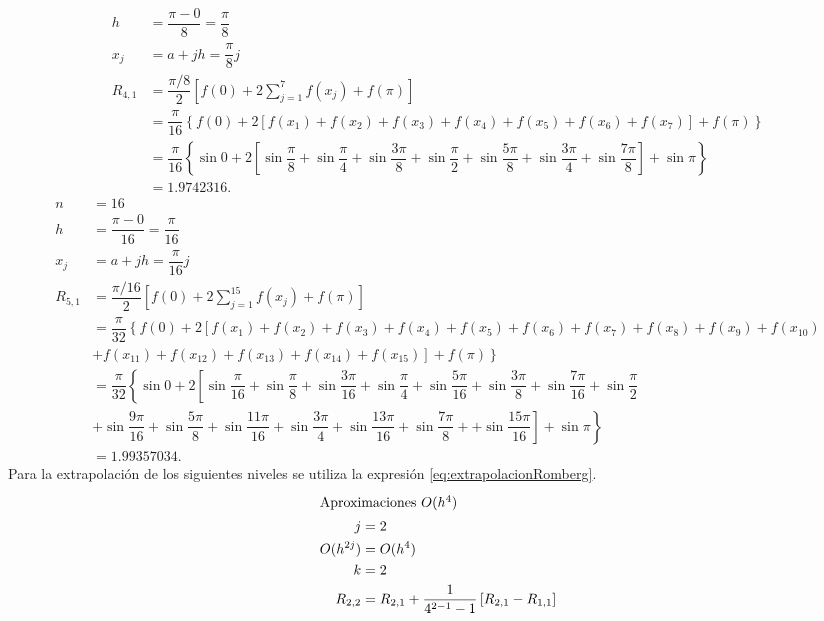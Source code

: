 \begin{exerciseT}
\begin{align*}
		h &= \dfrac{\pi-0}{8} = \dfrac{\pi}{8}\\
		x_j &= a+jh = \dfrac{\pi}{8}j\\
		R_{4,1} &= \dfrac{\pi/8}{2}\left[f(0) + 2\sum_{j=1}^7 f(x_j) + f(\pi) \right]\\
			&= \dfrac{\pi}{16}\left\lbrace f(0) + 2\left[ f(x_1) + f(x_2) + f(x_3) + f(x_4) + f(x_5) + f(x_6) + f(x_7) \right] + f(\pi) \right\rbrace\\
			&= \dfrac{\pi}{16}\left\lbrace \sin 0 + 2\left[ \sin \dfrac{\pi}{8} + \sin\dfrac{\pi}{4} + \sin\dfrac{3\pi}{8} + \sin\dfrac{\pi}{2} + 
				\sin\dfrac{5\pi}{8} + \sin\dfrac{3\pi}{4} + \sin\dfrac{7\pi}{8} \right] + \sin\pi \right\rbrace\\
			&= 1.9742316.
	\end{align*}
	\begin{align*}
		n &= 16\\
		h &= \dfrac{\pi-0}{16} = \dfrac{\pi}{16}\\
		x_j &= a+jh = \dfrac{\pi}{16}j\\
		R_{5,1} &= \dfrac{\pi/16}{2} \left[f(0) + 2\sum_{j=1}^{15} f(x_j) + f(\pi) \right]\\
			&= \dfrac{\pi}{32}\left\lbrace f(0) + 2\left[f(x_1) + f(x_2) + f(x_3) + f(x_4) + f(x_5) + f(x_6) + f(x_7) + f(x_8) + f(x_9) + f(x_{10})\right.\right.\\ 
			&+ \left.\left. f(x_{11})	+ f(x_{12}) + f(x_{13}) + f(x_{14}) + f(x_{15})  \right] + f(\pi) \right\rbrace\\
			&= \dfrac{\pi}{32} \left\lbrace \sin 0 + 2\left[\sin\dfrac{\pi}{16} + \sin\dfrac{\pi}{8} + \sin\dfrac{3\pi}{16} + \sin\dfrac{\pi}{4} + \sin\dfrac{5\pi}{16}
				+ \sin\dfrac{3\pi}{8} + \sin\dfrac{7\pi}{16} + \sin\dfrac{\pi}{2}\right.\right.\\
			&\left.\left. + \sin\dfrac{9\pi}{16} + \sin\dfrac{5\pi}{8} + \sin\dfrac{11\pi}{16} + \sin\dfrac{3\pi}{4} + \sin\dfrac{13\pi}{16} + \sin\dfrac{7\pi}{8} + 
				+ \sin\dfrac{15\pi}{16} \right] + \sin\pi \right\rbrace\\
			&= 1.99357034.
	\end{align*}
	Para la extrapolación de los siguientes niveles se utiliza la expresión \ref{eq:extrapolacionRomberg}.
	\begin{align*}
		\intertext{Aproximaciones $O(h^4)$}
		j &= 2\\
		O(h^{2j}) &= O(h^4)\\
		k &= 2\\
		R_{2,2} &= R_{2,1} + \dfrac{1}{4^{2-1}-1}\left[R_{2,1}-R_{1,1}\right]\\

\end{align*}
\end{exerciseT}

